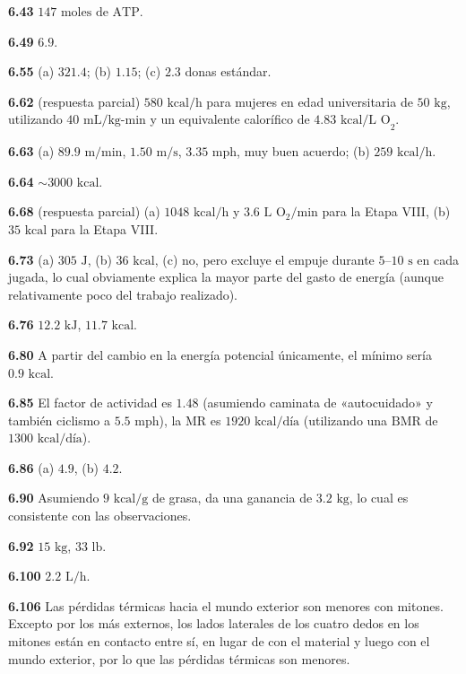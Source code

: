 \documentclass[12pt,a4paper]{book}
\begin{document}
\noindent \textbf{6.43} $147\text{ moles de ATP}$.

\noindent \textbf{6.49} $6.9$.

\noindent \textbf{6.55} (a) $321.4$; (b) $1.15$; (c) $2.3$ donas estándar.

\noindent \textbf{6.62} (respuesta parcial) $580\text{ kcal/h}$ para mujeres en edad universitaria de $50\text{ kg}$, utilizando $40\text{ mL/kg-min}$ y un equivalente calorífico de $4.83\text{ kcal/L O}_2$.

\noindent \textbf{6.63} (a) $89.9\text{ m/min}$, $1.50\text{ m/s}$, $3.35\text{ mph}$, muy buen acuerdo; (b) $259\text{ kcal/h}$.

\noindent \textbf{6.64} $\sim 3000\text{ kcal}$.

\noindent \textbf{6.68} (respuesta parcial) (a) $1048\text{ kcal/h}$ y $3.6\text{ L O}_2/\text{min}$ para la Etapa VIII, (b) $35\text{ kcal}$ para la Etapa VIII.

\noindent \textbf{6.73} (a) $305\text{ J}$, (b) $36\text{ kcal}$, (c) no, pero excluye el empuje durante $5\text{--}10\text{ s}$ en cada jugada, lo cual obviamente explica la mayor parte del gasto de energía (aunque relativamente poco del trabajo realizado).

\noindent \textbf{6.76} $12.2\text{ kJ}$, $11.7\text{ kcal}$.

\noindent \textbf{6.80} A partir del cambio en la energía potencial únicamente, el mínimo sería $0.9\text{ kcal}$.

\noindent \textbf{6.85} El factor de actividad es $1.48$ (asumiendo caminata de «autocuidado» y también ciclismo a $5.5\text{ mph}$), la $\text{MR}$ es $1920\text{ kcal/día}$ (utilizando una $\text{BMR}$ de $1300\text{ kcal/día}$).

\noindent \textbf{6.86} (a) $4.9$, (b) $4.2$.

\noindent \textbf{6.90} Asumiendo $9\text{ kcal/g}$ de grasa, da una ganancia de $3.2\text{ kg}$, lo cual es consistente con las observaciones.

\noindent \textbf{6.92} $15\text{ kg}$, $33\text{ lb}$.

\noindent \textbf{6.100} $2.2\text{ L/h}$.

\noindent \textbf{6.106} Las pérdidas térmicas hacia el mundo exterior son menores con mitones. Excepto por los más externos, los lados laterales de los cuatro dedos en los mitones están en contacto entre sí, en lugar de con el material y luego con el mundo exterior, por lo que las pérdidas térmicas son menores.
\end{document}

